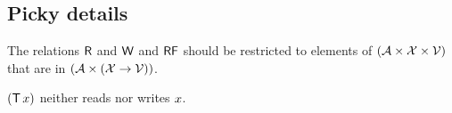 \subsection{Picky details}

The relations $\mathsf{R}$ and $\mathsf{W}$ and $\mathsf{RF}$ should be restricted
to elements of $(\mathcal{A} \times \mathcal{X} \times \mathcal{V})$ that are in
$(\mathcal{A} \times (\mathcal{X} \rightarrow \mathcal{V}))$.

$(\DT{\aLoc})$ neither reads nor writes $x$.



